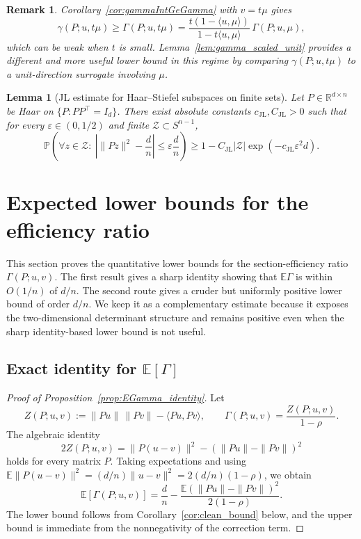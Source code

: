 \documentclass{article}
\newtheorem{lemma}{Lemma}
\newtheorem{remark}{Remark}
\begin{document}
\begin{remark}
Corollary~\ref{cor:gammaIntGeGamma} with $v=t\mu$ gives
\[
\gamma(P;u,t\mu)\ge \Gamma(P;u,t\mu)
=
\frac{t(1-\langle u,\mu\rangle)}{1-t\langle u,\mu\rangle}\,\Gamma(P;u,\mu),
\]
which can be weak when $t$ is small. Lemma~\ref{lem:gamma_scaled_unit} provides a different and more useful lower bound in this regime by comparing $\gamma(P;u,t\mu)$ to a unit-direction surrogate involving $\mu$.
\end{remark}

\begin{lemma}[JL estimate for Haar--Stiefel subspaces on finite sets]
\label{lem:JL_clean}
Let $P\in\mathbb R^{d\times n}$ be Haar on $\{P:PP^\top=I_d\}$. There exist absolute constants $c_{\mathrm{JL}},C_{\mathrm{JL}}>0$ such that for every $\varepsilon\in(0,1/2)$ and finite $\mathcal Z\subset S^{n-1}$,
\begin{equation}
\mathbb P\!\left(\forall z\in\mathcal Z:\ \left|\|Pz\|^2-\frac dn\right|\le \varepsilon\frac dn\right)
\ge 1-C_{\mathrm{JL}}|\mathcal Z|\exp(-c_{\mathrm{JL}}\varepsilon^2 d).
\label{eq:JLfinite_clean}
\end{equation}
\end{lemma}

\section{Expected lower bounds for the efficiency ratio}
\label{app:expected-gamma}

This section proves the quantitative lower bounds for the section-efficiency
ratio \(\Gamma(P;u,v)\). The first result gives a sharp identity showing that
\(\mathbb E\Gamma\) is within \(O(1/n)\) of \(d/n\). The second route gives a cruder but uniformly positive lower bound of order
\(d/n\). We keep it as a complementary estimate because it exposes the
two-dimensional determinant structure and remains positive even when the sharp
identity-based lower bound is not useful.

\subsection{Exact identity for $\mathbb E[\Gamma]$}



\begin{proof}[Proof of Proposition~\ref{prop:EGamma_identity}]
Let
\[
Z(P;u,v):=\|Pu\|\,\|Pv\|-\langle Pu,Pv\rangle,
\qquad
\Gamma(P;u,v)=\frac{Z(P;u,v)}{1-\rho}.
\]
The algebraic identity
\[
2Z(P;u,v)=\|P(u-v)\|^2-(\|Pu\|-\|Pv\|)^2
\]
holds for every matrix $P$.
Taking expectations and using
\(\mathbb E\|P(u-v)\|^2=(d/n)\|u-v\|^2=2(d/n)(1-\rho)\), we obtain
\[
\mathbb E[\Gamma(P;u,v)]
=
\frac dn
-
\frac{\mathbb E(\|Pu\|-\|Pv\|)^2}{2(1-\rho)}.
\]
The lower bound follows from Corollary~\ref{cor:clean_bound} below, and the
upper bound is immediate from the nonnegativity of the correction term.
\end{proof}
\end{document}
